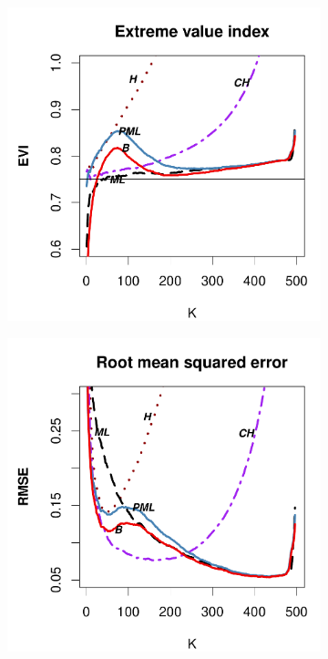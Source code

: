 \begin{figure}[h]
\begin{subfigure}[h]{0.40\linewidth}
		\end{subfigure}
		\bigskip
		\centering
		\begin{subfigure}[h]{0.40\linewidth}
			\includegraphics[width=\textwidth]{./plots/paper1/EVI_Outputburr0,75500.pdf}
		\end{subfigure}
		\hspace{\fill}
		\begin{subfigure}[h]{0.40\linewidth}
			\includegraphics[width=\textwidth]{./plots/paper1/RMSE_Outputburr0,75500.pdf}

\end{subfigure}
\end{figure}

